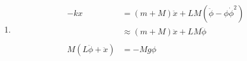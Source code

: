 \documentclass{article}
\begin{document}
\begin{enumerate}
  \item

        \begin{align*}
          -k x                         & = (m + M) \ddot{x} + L M (\ddot{\phi} - \phi \dot{\phi}^2) \\
                                       & \approx (m + M) \ddot{x} + L M \ddot{\phi}                 \\ \\
          M (L \ddot{\phi} + \ddot{x}) & = -M g \phi
        \end{align*}
\end{enumerate}

\setcounter{subsection}{32}
\subsection{}
\end{document}
